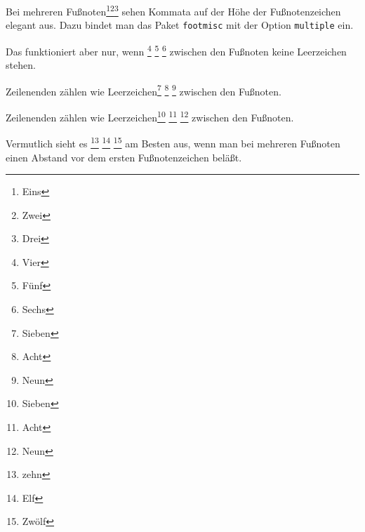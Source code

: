 \documentclass[a5paper]{article}
\begin{document}
Bei mehreren Fußnoten\footnote{Eins}\footnote{Zwei}\footnote{Drei}
sehen Kommata auf der Höhe der Fußnotenzeichen elegant aus.
Dazu bindet man das Paket \texttt{footmisc} mit der Option
\texttt{multiple} ein.

Das funktioniert aber nur, wenn \footnote{Vier} \footnote{Fünf} \footnote{Sechs}
zwischen den Fußnoten keine Leerzeichen stehen.

Zeilenenden zählen wie Leerzeichen\footnote{Sieben} 
\footnote{Acht}
\footnote{Neun}
zwischen den Fußnoten.


Zeilenenden zählen wie Leerzeichen\footnote{Sieben}%
\footnote{Acht}%
\footnote{Neun}
zwischen den Fußnoten.

Vermutlich sieht es \footnote{zehn}%
\footnote{Elf}%
\footnote{Zwölf}
am Besten aus, wenn man bei mehreren Fußnoten einen
Abstand vor dem ersten Fußnotenzeichen beläßt.
\end{document}
